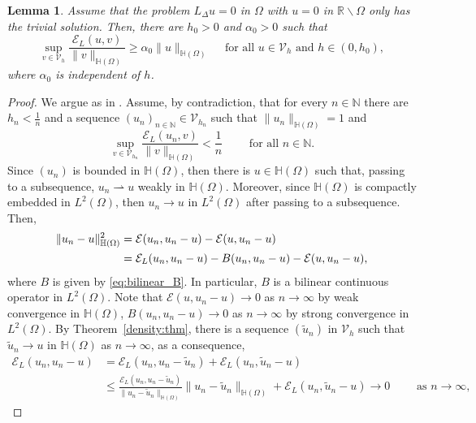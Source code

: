 \documentclass[10 pt]{article}
\newtheorem{lemma}[theorem]{Lemma}
\numberwithin{equation}{section}
\def\N{\mathbb{N}}
\def\R{\mathbb{R}}
\def\cE{\mathcal{E}}
\begin{document}
\begin{lemma}
Assume that the problem $L_\Delta u=0$ in $\Omega$ with $u=0$ in $\R\backslash  \Omega$ only has the trivial solution.  Then, there are $h_0>0$ and $\alpha_0>0$ such that
\begin{equation*}
    \sup_{v\in \mathcal V_h}\frac{\cE_{L}(u,v)}{\|v\|_{\mathbb H(\Omega)}}\geq \alpha_0\|u\|_{\mathbb H(\Omega)} \quad\text{ for all } u\in\mathcal V_h \text{ and }h\in(0,h_0),
\end{equation*}
where $\alpha_0$ is independent of $h$.
\end{lemma}
\begin{proof}
We argue as in \cite[Theorem 4.2.1]{dem20}. Assume, by contradiction, that for every $n\in\N$ there are $h_n<\frac{1}{n}$ and a sequence $(u_n)_{n\in\N}\in \mathcal V_{h_n}$ such that $\|u_n\|_{\mathbb H(\Omega)}=1$ and
\begin{equation}\label{ccea}
    \sup_{v\in \mathcal V_{h_n}}\frac{\cE_{L}(u_n,v)}{\|v\|_{\mathbb H(\Omega)}}<\frac{1}{n}\qquad \text{ for all }n\in\N.
\end{equation}
Since $(u_n)$ is bounded in $\mathbb H(\Omega)$, then there is $u\in \mathbb H(\Omega)$ such that, passing to a subsequence, $u_n \rightharpoonup u$ weakly in $\mathbb H(\Omega)$. Moreover, since $\mathbb H(\Omega)$ is compactly embedded in $L^2(\Omega)$, then $u_n\to u$ in $L^2(\Omega)$ after passing to a subsequence.  Then,
\begin{align}
    \|u_n-u\|^2_{\mathbb H(\Omega)}
    &=\cE(u_n,u_n-u)-\cE(u,u_n-u)\notag\\
    &=\cE_L(u_n,u_n-u)-B(u_n,u_n-u)-\cE(u,u_n-u),\label{007}
\end{align}
where $B$ is given by \eqref{eq:bilinear_B}.  In particular, $B$ is a bilinear continuous operator in $L^2(\Omega)$.  Note that $\cE(u,u_n-u)\to 0$ as $n\to \infty$ by weak convergence in $\mathbb H(\Omega)$, $B(u_n,u_n-u)\to 0$ as $n\to \infty$ by strong convergence in $L^2(\Omega)$. By Theorem~\ref{density:thm}, there is a sequence $(\widetilde u_n)$ in $\mathcal V_h$ such that $\widetilde u_n\to u$ in $\mathbb H(\Omega)$ as $n\to \infty$, as a consequence,
\begin{align*}
    \cE_L(u_n,u_n-u)
    &=\cE_L(u_n,u_n-\widetilde u_n)+\cE_L(u_n,\widetilde u_n-u)\\
    &\leq \frac{\cE_L(u_n,u_n-\widetilde u_n)}{\|u_n-\widetilde u_n\|_{\mathbb H(\Omega)}}\|u_n-\widetilde u_n\|_{\mathbb H(\Omega)}+\cE_L(u_n,\widetilde u_n-u) \to 0\qquad \text{ as }n\to \infty,
\end{align*}

\end{proof}
\end{document}
